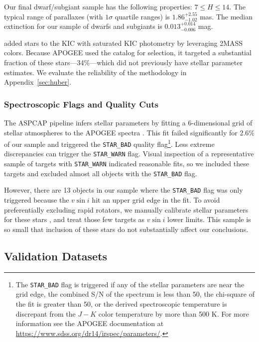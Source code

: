 \documentclass[preprint2]{aastex62}
\newcommand{\vsini}{\ensuremath{v \sin i}}
\newcommand{\STARBAD}{\texttt{STAR\_BAD}}
\newcommand{\STARWARN}{\texttt{STAR\_WARN}}
\begin{document}
Our final dwarf/subgiant sample has the following properties: \(7 \le H \le 14\). The typical range of parallaxes
(with \(1\sigma\) quartile ranges) is \(1.86^{+2.55}_{-1.02} \) mas. The median extinction 
 for
our sample of dwarfs and subgiants is \(0.013^{+0.014}_{-0.006}\) mag.

\citet{Huber14} added stars to the KIC with saturated KIC photometry by
leveraging 2MASS colors. Because APOGEE used the \citet{Huber14} catalog for
selection, it targeted a substantial fraction of these stars---34\%---which
did not previously have stellar parameter estimates. We evaluate the 
reliability of the \citet{Huber14} methodology in Appendix~\ref{sec:huber}.



\subsubsection{Spectroscopic Flags and Quality Cuts}

The ASPCAP pipeline infers stellar parameters \citep{GarciaPerez16} by fitting 
a 6-dimensional grid of stellar atmospheres to the APOGEE spectra 
\citep{AllendePrieto06}. This fit failed significantly for 2.6\% of our sample 
and triggered
the \STARBAD{} quality flag\footnote{The \STARBAD{} flag is triggered if any of the stellar parameters are near the grid edge, the combined S/N of the spectrum is less than 50, the chi-square of the fit is greater than 50, or the derived spectroscopic temperature is discrepant from the \citet{GonzalezHernandez09} \(J-K\) color temperature by more than 500 K. For more information see the APOGEE documentation at \url{https://www.sdss.org/dr14/irspec/parameters/}.}. Less extreme discrepancies can trigger the
\STARWARN{} flag. Visual inspection of a representative sample of targets with
\STARWARN{} indicated reasonable fits, so we included these targets and
excluded almost all objects with the \STARBAD{} flag.

However, there are 13 objects in our sample where the \STARBAD{} flag was only 
triggered because the \vsini{} hit an upper grid edge in the fit. To avoid
preferentially excluding rapid rotators, we manually calibrate stellar 
parameters for these stars \citep{Holtzman18}, and treat those few targets as 
\vsini{} lower limits. This sample is so small that inclusion of these stars do not substantially affect our conclusions.


\subsection{Validation Datasets}
\label{sec:valdata}
\end{document}
